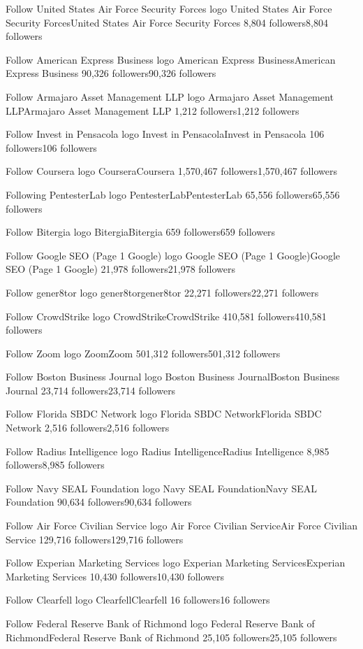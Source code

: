 Follow
United States Air Force Security Forces logo
United States Air Force Security ForcesUnited States Air Force Security Forces
8,804 followers8,804 followers

Follow
American Express Business logo
American Express BusinessAmerican Express Business
90,326 followers90,326 followers

Follow
Armajaro Asset Management LLP logo
Armajaro Asset Management LLPArmajaro Asset Management LLP
1,212 followers1,212 followers

Follow
Invest in Pensacola logo
Invest in PensacolaInvest in Pensacola
106 followers106 followers

Follow
Coursera logo
CourseraCoursera
1,570,467 followers1,570,467 followers

Following
PentesterLab logo
PentesterLabPentesterLab
65,556 followers65,556 followers

Follow
Bitergia logo
BitergiaBitergia
659 followers659 followers

Follow
Google SEO (Page 1 Google) logo
Google SEO (Page 1 Google)Google SEO (Page 1 Google)
21,978 followers21,978 followers

Follow
gener8tor logo
gener8torgener8tor
22,271 followers22,271 followers

Follow
CrowdStrike logo
CrowdStrikeCrowdStrike
410,581 followers410,581 followers

Follow
Zoom logo
ZoomZoom
501,312 followers501,312 followers

Follow
Boston Business Journal logo
Boston Business JournalBoston Business Journal
23,714 followers23,714 followers

Follow
Florida SBDC Network logo
Florida SBDC NetworkFlorida SBDC Network
2,516 followers2,516 followers

Follow
Radius Intelligence logo
Radius IntelligenceRadius Intelligence
8,985 followers8,985 followers

Follow
Navy SEAL Foundation logo
Navy SEAL FoundationNavy SEAL Foundation
90,634 followers90,634 followers

Follow
Air Force Civilian Service logo
Air Force Civilian ServiceAir Force Civilian Service
129,716 followers129,716 followers

Follow
Experian Marketing Services logo
Experian Marketing ServicesExperian Marketing Services
10,430 followers10,430 followers

Follow
Clearfell logo
ClearfellClearfell
16 followers16 followers

Follow
Federal Reserve Bank of Richmond logo
Federal Reserve Bank of RichmondFederal Reserve Bank of Richmond
25,105 followers25,105 followers

